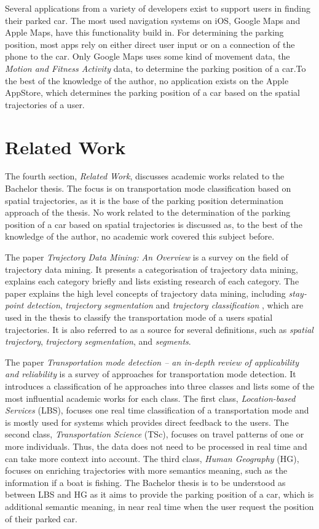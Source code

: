 Several applications from a variety of developers exist to support users in finding their parked car. The most used navigation systems on iOS, Google Maps and Apple Maps, have this functionality build in. For determining the parking position, most apps rely on either direct user input or on a connection of the phone to the car. Only Google Maps uses some kind of movement data, the \textit{Motion and Fitness Activity} data, to determine the parking position of a car.To the best of the knowledge of the author, no application exists on the Apple AppStore, which determines the parking position of a car based on the spatial trajectories of a user.


\section{Related Work}
The fourth section, \textit{Related Work}, discusses academic works related to the Bachelor thesis. The focus is on transportation mode classification based on spatial trajectories, as it is the base of the parking position determination approach of the thesis. No work related to the determination of the parking position of a car based on spatial trajectories is discussed as, to the best of the knowledge of the author, no academic work covered this subject before.

The paper \textit{Trajectory Data Mining: An Overview} \cite{Zheng:2015:TDM:2764959.2743025} is a survey on the field of trajectory data mining. It presents a categorisation of trajectory data mining, explains each category briefly and lists existing research of each category.\newline
The paper explains the high level concepts of trajectory data mining, including \textit{stay-point detection}, \textit{trajectory segmentation} and \textit{trajectory classification} , which are used in the thesis to classify the transportation mode of a users spatial trajectories. It is also referred to as a source for several definitions, such as \textit{spatial trajectory}, \textit{trajectory segmentation},  and \textit{segments}.

The paper \textit{Transportation mode detection – an in-depth review of applicability and reliability} \cite{Prelipcean2017} is a survey of approaches for transportation mode detection. It introduces a classification of he approaches into three classes and lists some of the most influential academic works for each class. The first class, \textit{Location-based Services} (LBS), focuses one real time classification of a transportation mode and is mostly used for systems which provides direct feedback to the users. The second class, \textit{Transportation Science} (TSc), focuses on travel patterns of one or more individuals. Thus, the data does not need to be processed in real time and can take more context into account. The third class, \textit{Human Geography} (HG), focuses on enriching trajectories with more semantics meaning, such as the information if a boat is fishing.\newline
The Bachelor thesis is to be understood as between LBS and HG as it aims to provide the parking position of a car, which is additional semantic meaning, in near real time when the user request the position of their parked car. 

